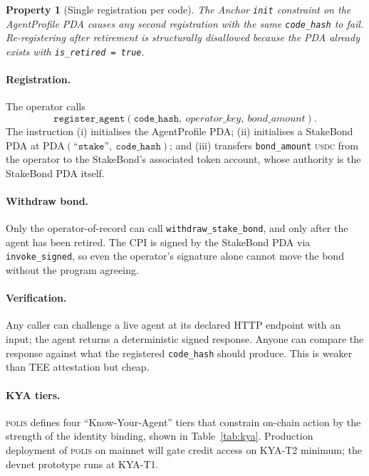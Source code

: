 \documentclass[10pt,conference,letterpaper]{IEEEtran}
\newtheorem{property}[theorem]{Property}
\theoremstyle{definition}
\newcommand{\polis}{\textsc{polis}\xspace}
\newcommand{\codehash}{\texttt{code\_hash}}
\newcommand{\PDA}[1]{\ensuremath{\mathrm{PDA}(#1)}}
\newcommand{\USDC}{\textsc{usdc}}
\begin{document}
\begin{property}[Single registration per code]\label{prop:singleton}
The Anchor \texttt{init} constraint on the AgentProfile PDA causes any
second registration with the same \codehash{} to fail. Re-registering
after retirement is structurally disallowed because the PDA already
exists with \texttt{is\_retired = true}.
\end{property}

\paragraph{Registration.} The operator calls
\[
\texttt{register\_agent}(\codehash,\ \mathit{operator\_key},\ \mathit{bond\_amount}).
\]
The instruction (i) initialises the AgentProfile PDA; (ii) initialises
a StakeBond PDA at $\PDA{\texttt{``stake''},\ \codehash}$; and
(iii) transfers \texttt{bond\_amount} \USDC{} from the operator to the
StakeBond's associated token account, whose authority is the StakeBond
PDA itself.

\paragraph{Withdraw bond.} Only the operator-of-record can call
\texttt{withdraw\_stake\_bond}, and only after the agent has been
retired. The CPI is signed by the StakeBond PDA via
\texttt{invoke\_signed}, so even the operator's signature alone cannot
move the bond without the program agreeing.

\paragraph{Verification.} Any caller can challenge a live agent at its
declared HTTP endpoint with an input; the agent returns a deterministic
signed response. Anyone can compare the response against what the
registered \codehash{} should produce. This is weaker than TEE
attestation but cheap.

\paragraph{KYA tiers.} \polis defines four ``Know-Your-Agent'' tiers
that constrain on-chain action by the strength of the identity binding,
shown in Table~\ref{tab:kya}. Production deployment of \polis on
mainnet will gate credit access on KYA-T2 minimum; the devnet prototype
runs at KYA-T1.
\end{document}
